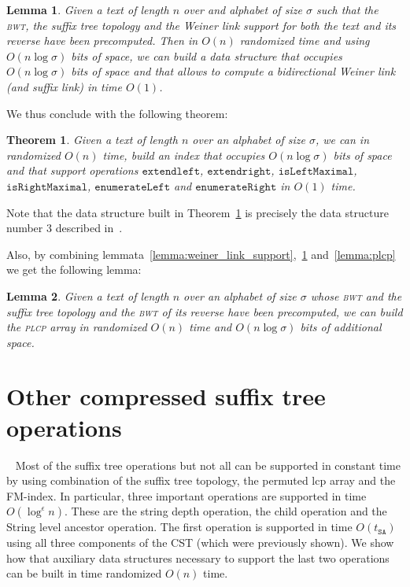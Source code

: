\documentclass[a4paper]{article}
\newtheorem{lemma}{Lemma}
\newtheorem{theorem}{Theorem}
\begin{document}
\begin{lemma}
\label{lemma:bi_weiner_link_support}
Given a text of length $n$ over and alphabet of size $\sigma$ 
such that the \textsc{bwt}, the suffix tree topology and 
the Weiner link support for both the text and its reverse 
have been precomputed. Then in $O(n)$ randomized time 
and using $O(n\log\sigma)$ bits of space, we can build a data structure 
that occupies $O(n\log\sigma)$ bits of space and that allows to compute a 
bidirectional Weiner link (and suffix link) in time $O(1)$.
\end{lemma}
We thus conclude with the following theorem:
\begin{theorem}
\label{theo:full_double_BWT}
Given a text of length $n$ over an alphabet of size $\sigma$, 
we can in randomized $O(n)$ time, build an index that occupies 
$O(n\log\sigma)$ bits of space and that support operations $\mathtt{extendleft}$, 
$\mathtt{extendright}$, $\mathtt{isLeftMaximal}$, $\mathtt{isRightMaximal}$, 
$\mathtt{enumerateLeft}$ and $\mathtt{enumerateRight}$ in $O(1)$ time. 
\end{theorem}
Note that the data structure built in Theorem~\ref{theo:full_double_BWT} 
is precisely the data structure number $3$ described in~\cite{BCKM13}. 

Also, by combining lemmata~\ref{lemma:weiner_link_support},~\ref{lemma:bi_weiner_link_support} and~\ref{lemma:plcp} 
we get the following lemma:
\begin{lemma}
\label{lemma:plcp2}
Given a text of length $n$ over an alphabet of size $\sigma$ 
whose \textsc{bwt} and the suffix tree topology 
and the \textsc{bwt} of its reverse have been precomputed,
we can build the \textsc{plcp} array in randomized 
$O(n)$ time and $O(n\log\sigma)$ bits of 
additional space. 
\end{lemma}
\section{Other compressed suffix tree operations}
~\label{sec:build_cst}
Most of the suffix tree operations but not all can be supported in constant time by using combination of the suffix tree topology, the permuted lcp array and the FM-index. In particular, three important operations are supported in time $O(\log^\epsilon n)$. These are the string depth operation, the child operation and the String level ancestor operation. The first operation is supported in time $O(t_{\mathtt{SA}})$ using all three components of the CST (which were previously shown). We show how that auxiliary data structures necessary to support the last two operations can be built in time randomized $O(n)$ time. 
\end{document}

